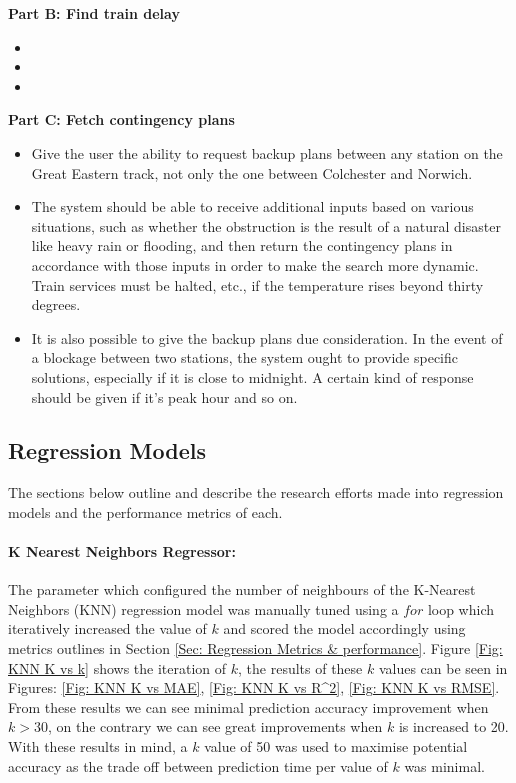 \textbf{Part B: Find train delay}

\begin{itemize}
    \item 
    \item 
    \item 
\end{itemize}

\textbf{Part C: Fetch contingency plans}

\begin{itemize}
    \item Give the user the ability to request backup plans between any station on the Great Eastern track, not only the one between Colchester and Norwich.
    \item The system should be able to receive additional inputs based on various situations, such as whether the obstruction is the result of a natural disaster like heavy rain or flooding, and then return the contingency plans in accordance with those inputs in order to make the search more dynamic. Train services must be halted, etc., if the temperature rises beyond thirty degrees.
    \item It is also possible to give the backup plans due consideration. In the event of a blockage between two stations, the system ought to provide specific solutions, especially if it is close to midnight. A certain kind of response should be given if it's peak hour and so on.
\end{itemize}

\subsection{Regression Models}
The sections below outline and describe the research efforts made into regression models and the performance metrics of each.

\paragraph{K Nearest Neighbors Regressor:} \label{Sec: KNN tuning}
The parameter which configured the number of neighbours of the K-Nearest Neighbors (KNN) regression model was manually tuned using a $for$ loop which iteratively increased the value of $k$ and scored the model accordingly using metrics outlines in Section \ref{Sec: Regression Metrics & performance}. Figure \ref{Fig: KNN K vs k} shows the iteration of $k$, the results of these $k$ values can be seen in Figures: \ref{Fig: KNN K vs MAE}, \ref{Fig: KNN K vs R^2}, \ref{Fig: KNN K vs RMSE}. From these results we can see minimal prediction accuracy improvement when $k > 30$, on the contrary we can see great improvements when $k$ is increased to 20. With these results in mind, a $k$ value of 50 was used to maximise potential accuracy as the trade off between prediction time per value of $k$ was minimal.


